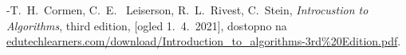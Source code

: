 \documentclass[a4paper,11pt]{article}
\begin{document}

\newpage
\begin{thebibliography}{99}
    \bibitem -T.~H.~Cormen, C.~E.~ Leiserson, R.~L.~Rivest, C.~Stein, \emph{Introcustion to Algorithms}, third edition, [ogled 1.~4.~2021], dostopno na \url{edutechlearners.com/download/Introduction_to_algorithms-3rd%20Edition.pdf}.
\end{thebibliography}
    
\end{document}
